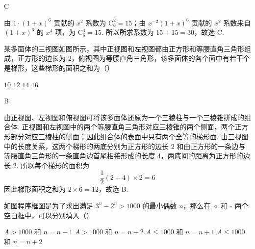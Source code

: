 \begin{answer}
C
\end{answer}

\begin{solution}
由 \(1\cdot(1+x)^6\) 贡献的 \(x^2\) 系数为 \(\mathrm C_6^2=15\)；由 \(x^{-2}(1+x)^6\) 贡献的 \(x^2\) 系数来自 \((1+x)^6\) 的 \(x^4\) 项，为 \(\mathrm C_6^4=15\). 所以所求系数为 \(15+15=30\)，故选 C.
\end{solution}

\begin{problem}
某多面体的三视图如图所示，其中正视图和左视图都由正方形和等腰直角三角形组成，正方形的边长为 \(2\)，俯视图为等腰直角三角形，该多面体的各个面中有若干个是梯形，这些梯形的面积之和为（\quad）


\choices
    {\(10\)}
    {\(12\)}
    {\(14\)}
    {\(16\)}
\end{problem}

\begin{answer}
B
\end{answer}

\begin{solution}
由正视图、左视图和俯视图可将该多面体还原为一个三棱柱与一个三棱锥拼成的组合体. 正视图和左视图中的两个等腰直角三角形对应三棱锥的两个侧面，两个正方形部分对应三棱柱的侧面；因此组合体的表面中只有两个全等的梯形面. 由三视图中的长度关系，这两个梯形的两底分别为正方形的边长 \(2\) 和由正方形的一条边与等腰直角三角形的一条直角边首尾相接形成的长度 \(4\)，两底间的距离为正方形的边长 \(2\). 所以每个梯形的面积为
\[
\frac12(2+4)\times2=6
\]
因此梯形面积之和为 \(2\times6=12\)，故选 B.
\end{solution}

\begin{problem}
如图程序框图是为了求出满足 \(3^n-2^n>1000\) 的最小偶数 \(n\)，那么在 \(\diamond\) 和 \(\square\) 两个空白框中，可以分别填入（\quad）


\choices
    {\(A>1000\) 和 \(n=n+1\)}
    {\(A>1000\) 和 \(n=n+2\)}
    {\(A\le 1000\) 和 \(n=n+1\)}
    {\(A\le 1000\) 和 \(n=n+2\)}
\end{problem}

